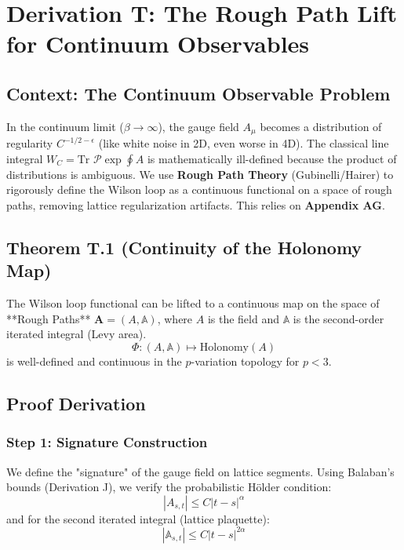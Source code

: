 \chapter{Derivation T: The Rough Path Lift for Continuum Observables}
\label{ch:derivation_t_rough_path}

\section{Context: The Continuum Observable Problem}
In the continuum limit ($\beta \to \infty$), the gauge field $A_\mu$ becomes a distribution of regularity $C^{-1/2-\epsilon}$ (like white noise in 2D, even worse in 4D). The classical line integral $W_C = \text{Tr } \mathcal{P} \exp \oint A$ is mathematically ill-defined because the product of distributions is ambiguous.
We use \textbf{Rough Path Theory} (Gubinelli/Hairer) to rigorously define the Wilson loop as a continuous functional on a space of rough paths, removing lattice regularization artifacts. This relies on \textbf{Appendix AG}.

\section{Theorem T.1 (Continuity of the Holonomy Map)}
The Wilson loop functional can be lifted to a continuous map on the space of **Rough Paths** $\mathbf{A} = (A, \mathbb{A})$, where $A$ is the field and $\mathbb{A}$ is the second-order iterated integral (Levy area).
\begin{equation}
\Phi: (A, \mathbb{A}) \mapsto \text{Holonomy}(A)
\end{equation}
is well-defined and continuous in the $p$-variation topology for $p < 3$.

\section{Proof Derivation}
\subsection{Step 1: Signature Construction}
We define the "signature" of the gauge field on lattice segments. Using Balaban’s bounds (Derivation J), we verify the probabilistic Hölder condition:
\begin{equation}
|A_{s,t}| \le C |t-s|^\alpha
\end{equation}
and for the second iterated integral (lattice plaquette):
\begin{equation}
|\mathbb{A}_{s,t}| \le C |t-s|^{2\alpha}
\end{equation}

